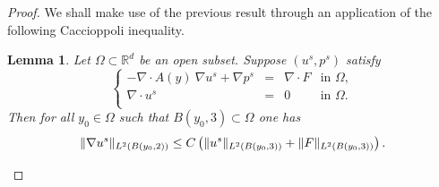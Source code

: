 \documentclass[11pt, reqno]{amsart}
\newtheorem{lemma}[theorem]{Lemma}
\theoremstyle{definition}
\theoremstyle{remark}
\numberwithin{equation}{section}
\begin{document}
\begin{appendices}
\begin{proof}
	We shall make use of the previous result through an application of the following Caccioppoli inequality.
	\begin{lemma}\label{Caccio}
		Let  $\Omega \subset \mathbb{R}^d$ be an open subset. Suppose $(u^s,p^s)$ satisfy
		\begin{equation*}
			\left\{
			\begin{array}{rcll}
				-\nabla\cdot A (y) \: \nabla u^s +  \nabla p^s&=& \nabla\cdot F& \mbox{in } \Omega,\\
				\nabla\cdot u^s&=& 0& \mbox{in } \Omega. \\
			\end{array}
			\right. 
		\end{equation*}
		Then for all $y_0\in\Omega $ such that $B(y_0,3)\subset \Omega$ one has
		\begin{equation*}\label{intlips}
			\| \nabla u^s \| _{L^2(B(y_0,2))} \leq  C \left( \| u^s\|_{L^2(B(y_0,3))} + \| F \|_{L^2(B(y_0,3))} \right).\\ 
		\end{equation*}
	\end{lemma}
	

\end{proof}
\end{appendices}
\end{document}
